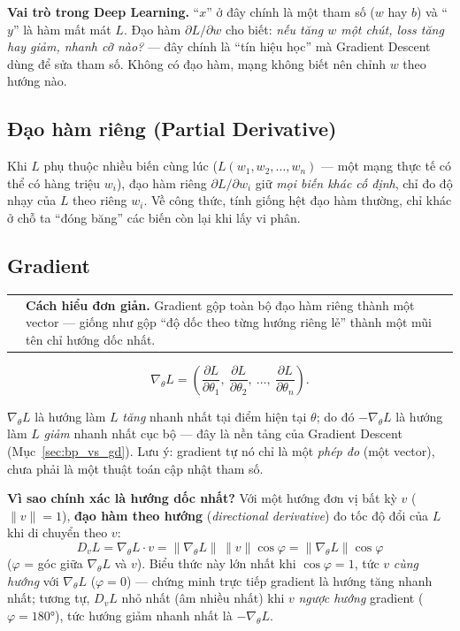\documentclass[12pt,a4paper]{report}
\makeatletter
\newenvironment{tructiep}[1][Cách hiểu đơn giản]
  {\par\smallskip\noindent\begin{tabular}{@{}p{0.35em}@{\hspace{6pt}}p{\dimexpr\linewidth-1.9em\relax}@{}}
   \textcolor{boxln}{\rule{2pt}{\baselineskip}} & \textbf{#1.}\enspace\ignorespaces}
  {\end{tabular}\par\smallskip}
\newcommand{\en}[1]{\textit{#1}}
\makeatother
\begin{document}
\textbf{Vai trò trong Deep Learning.} ``$x$'' ở đây chính là một tham số
($w$ hay $b$) và ``$y$'' là hàm mất mát $L$. Đạo hàm $\partial L/\partial w$
cho biết: \emph{nếu tăng $w$ một chút, loss tăng hay giảm, nhanh cỡ nào?}
--- đây chính là ``tín hiệu học'' mà Gradient Descent dùng để sửa tham số.
Không có đạo hàm, mạng không biết nên chỉnh $w$ theo hướng nào.

\subsection{Đạo hàm riêng (Partial Derivative)}

Khi $L$ phụ thuộc nhiều biến cùng lúc ($L(w_1,w_2,\ldots,w_n)$ --- một
mạng thực tế có thể có hàng triệu $w_i$), đạo hàm riêng
$\partial L/\partial w_i$ giữ \emph{mọi biến khác cố định}, chỉ đo độ nhạy
của $L$ theo riêng $w_i$. Về công thức, tính giống hệt đạo hàm thường, chỉ
khác ở chỗ ta ``đóng băng'' các biến còn lại khi lấy vi phân.

\subsection{Gradient}

\begin{tructiep}
Gradient gộp toàn bộ đạo hàm riêng thành một vector --- giống như gộp ``độ
dốc theo từng hướng riêng lẻ'' thành một mũi tên chỉ hướng dốc nhất.
\end{tructiep}

$$\nabla_\theta L = \left(\frac{\partial L}{\partial\theta_1},\ \frac{\partial L}{\partial\theta_2},\ \ldots,\ \frac{\partial L}{\partial\theta_n}\right).$$

$\nabla_\theta L$ là hướng làm $L$ \emph{tăng} nhanh nhất tại điểm hiện tại
$\theta$; do đó $-\nabla_\theta L$ là hướng làm $L$ \emph{giảm} nhanh nhất
cục bộ --- đây là nền tảng của Gradient Descent (Mục~\ref{sec:bp_vs_gd}).
Lưu ý: gradient tự nó chỉ là một \emph{phép đo} (một vector), chưa phải là
một thuật toán cập nhật tham số.

\textbf{Vì sao chính xác là hướng dốc nhất?} Với một hướng đơn vị bất kỳ
$v$ ($\lVert v\rVert=1$), \textbf{đạo hàm theo hướng} (\en{directional
derivative}) đo tốc độ đổi của $L$ khi di chuyển theo $v$:
$$D_v L = \nabla_\theta L \cdot v = \lVert\nabla_\theta L\rVert\,\lVert v\rVert\cos\varphi = \lVert\nabla_\theta L\rVert\cos\varphi$$
($\varphi$ = góc giữa $\nabla_\theta L$ và $v$). Biểu thức này lớn nhất
khi $\cos\varphi=1$, tức $v$ \emph{cùng hướng} với $\nabla_\theta L$
($\varphi=0$) --- chứng minh trực tiếp gradient là hướng tăng nhanh nhất;
tương tự, $D_vL$ nhỏ nhất (âm nhiều nhất) khi $v$ \emph{ngược hướng}
gradient ($\varphi=180°$), tức hướng giảm nhanh nhất là $-\nabla_\theta L$.
\end{document}
